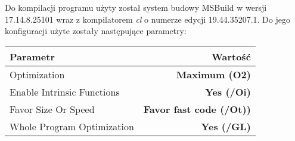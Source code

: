 Do kompilacji programu użyty został system budowy MSBuild w wersji 17.14.8.25101 wraz z kompilatorem \textit{cl} o numerze edycji 19.44.35207.1. Do jego konfiguracji użyte zostały następujące parametry:

\begin{center}
	\begin{tabular}{ |l r| }
		\hline
		\textbf{Parametr} & \textbf{Wartość} \\
		\hline
		Optimization & \textbf{Maximum (O2)} \\
		Enable Intrinsic Functions & \textbf{Yes (/Oi)} \\
		Favor Size Or Speed & \textbf{Favor fast code (/Ot))} \\
		Whole Program Optimization & \textbf{Yes (/GL)} \\
		\hline
	\end{tabular}
\end{center}